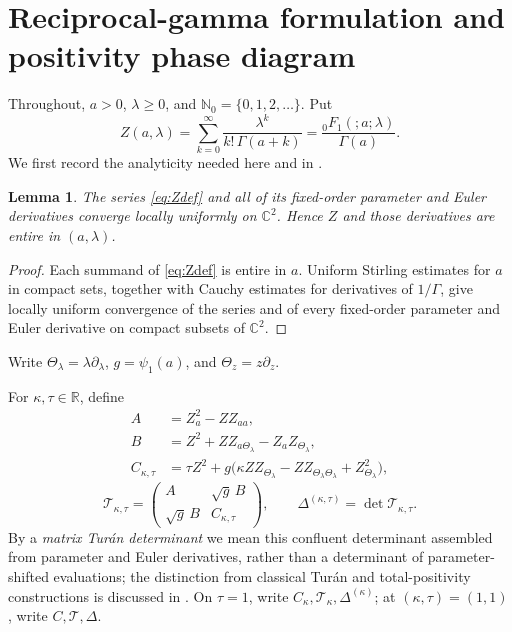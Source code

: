 \documentclass[11pt,a4paper]{amsart}
\numberwithin{equation}{section}
\theoremstyle{plain}
\newtheorem{lemma}[theorem]{Lemma}
\theoremstyle{definition}
\newcommand{\R}{\mathbb R}
\newcommand{\N}{\mathbb N}
\newcommand{\Turan}{\mathcal T}
\newcommand{\Thetal}{\Theta_{\lambda}}
\newcommand{\Thetaz}{\Theta_z}
\begin{document}
\section{Reciprocal-gamma formulation and positivity phase diagram}\label{sec:main}

Throughout, \(a>0\), \(\lambda\ge0\), and \(\N_0=\{0,1,2,\ldots\}\).  Put
\begin{equation}\label{eq:Zdef}
 Z(a,\lambda)=\sum_{k=0}^{\infty}\frac{\lambda^k}{k!\,\Gamma(a+k)}
 =\frac{{}_0F_1(;a;\lambda)}{\Gamma(a)}.
\end{equation}
We first record the analyticity needed here and in .

\begin{lemma}\label{lem:continuation}
The series \eqref{eq:Zdef} and all of its fixed-order parameter and Euler
derivatives converge locally uniformly on \(\mathbb C^2\).  Hence \(Z\) and
those derivatives are entire in \((a,\lambda)\).
\end{lemma}

\begin{proof}
Each summand of \eqref{eq:Zdef} is entire in \(a\).  Uniform Stirling estimates
for \(a\) in compact sets, together with Cauchy estimates for derivatives of
\(1/\Gamma\), give locally uniform convergence of the series and of every
fixed-order parameter and Euler derivative on compact subsets of
\(\mathbb C^2\).
\end{proof}

Write \(\Thetal=\lambda\partial_\lambda\), \(g=\psi_1(a)\), and
\(\Thetaz=z\partial_z\).

For \(\kappa,\tau\in\R\), define
\begin{align}
 A&=Z_a^2-ZZ_{aa},\label{eq:Adef}\\
 B&=Z^2+ZZ_{a\Thetal}-Z_aZ_{\Thetal},\label{eq:Bdef}\\
 C_{\kappa,\tau}
 &=\tau Z^2+g\bigl(\kappa ZZ_{\Thetal}-ZZ_{\Thetal\Thetal}+Z_{\Thetal}^2\bigr),
 \label{eq:Ckt-def}
\end{align}
\begin{equation}\label{eq:Tkt}
 \Turan_{\kappa,\tau}
 =\begin{pmatrix}A&\sqrt g\,B\\ \sqrt g\,B&C_{\kappa,\tau}\end{pmatrix},
 \qquad
 \Delta^{(\kappa,\tau)}=\det\Turan_{\kappa,\tau}.
\end{equation}
By a \emph{matrix Tur\'an determinant} we mean this confluent determinant
assembled from parameter and Euler derivatives, rather than a determinant of
parameter-shifted evaluations; the distinction from classical Tur\'an and
total-positivity constructions is discussed in .
On \(\tau=1\), write \(C_\kappa,\Turan_\kappa,\Delta^{(\kappa)}\); at
\((\kappa,\tau)=(1,1)\), write \(C,\Turan,\Delta\).
\end{document}

